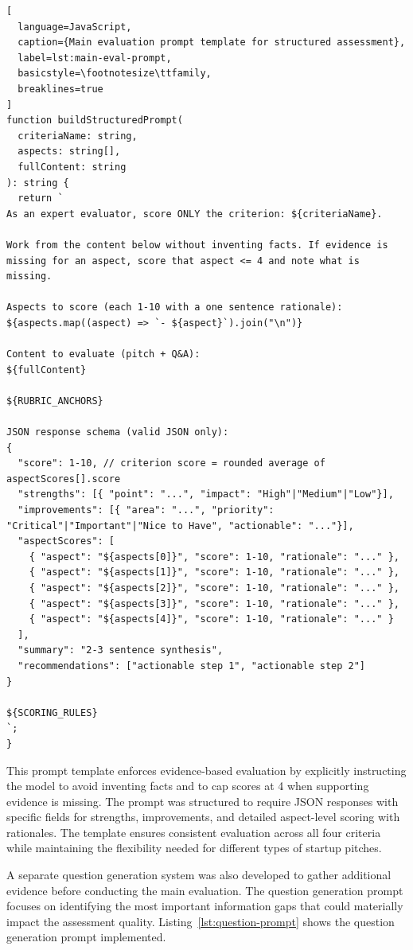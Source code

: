 \begin{lstlisting}[
  language=JavaScript,
  caption={Main evaluation prompt template for structured assessment},
  label=lst:main-eval-prompt,
  basicstyle=\footnotesize\ttfamily,
  breaklines=true
]
function buildStructuredPrompt(
  criteriaName: string,
  aspects: string[],
  fullContent: string
): string {
  return `
As an expert evaluator, score ONLY the criterion: ${criteriaName}.

Work from the content below without inventing facts. If evidence is 
missing for an aspect, score that aspect <= 4 and note what is missing.

Aspects to score (each 1-10 with a one sentence rationale):
${aspects.map((aspect) => `- ${aspect}`).join("\n")}

Content to evaluate (pitch + Q&A):
${fullContent}

${RUBRIC_ANCHORS}

JSON response schema (valid JSON only):
{
  "score": 1-10, // criterion score = rounded average of aspectScores[].score
  "strengths": [{ "point": "...", "impact": "High"|"Medium"|"Low"}],
  "improvements": [{ "area": "...", "priority": "Critical"|"Important"|"Nice to Have", "actionable": "..."}],
  "aspectScores": [
    { "aspect": "${aspects[0]}", "score": 1-10, "rationale": "..." },
    { "aspect": "${aspects[1]}", "score": 1-10, "rationale": "..." },
    { "aspect": "${aspects[2]}", "score": 1-10, "rationale": "..." },
    { "aspect": "${aspects[3]}", "score": 1-10, "rationale": "..." },
    { "aspect": "${aspects[4]}", "score": 1-10, "rationale": "..." }
  ],
  "summary": "2-3 sentence synthesis",
  "recommendations": ["actionable step 1", "actionable step 2"]
}

${SCORING_RULES}
`;
}
\end{lstlisting}

This prompt template enforces evidence-based evaluation by explicitly instructing the model to avoid inventing facts and to cap scores at 4 when supporting evidence is missing. The prompt was structured to require JSON responses with specific fields for strengths, improvements, and detailed aspect-level scoring with rationales. The template ensures consistent evaluation across all four criteria while maintaining the flexibility needed for different types of startup pitches.

A separate question generation system was also developed to gather additional evidence before conducting the main evaluation. The question generation prompt focuses on identifying the most important information gaps that could materially impact the assessment quality. Listing~\ref{lst:question-prompt} shows the question generation prompt implemented.

